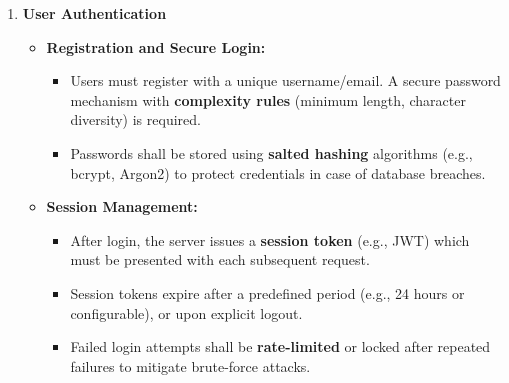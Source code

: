 \documentclass{article}
\begin{document}
\begin{enumerate}[label=\textbf{FR\arabic*.}]
\item \textbf{User Authentication}
\begin{itemize}
    \item \textbf{Registration and Secure Login:}
    \begin{itemize}
        \item Users must register with a unique username/email. A secure password mechanism with \textbf{complexity rules} (minimum length, character diversity) is required.
        \item Passwords shall be stored using \textbf{salted hashing} algorithms (e.g., bcrypt, Argon2) to protect credentials in case of database breaches.
    \end{itemize}
    \item \textbf{Session Management:}
    \begin{itemize}
        \item After login, the server issues a \textbf{session token} (e.g., JWT) which must be presented with each subsequent request.
        \item Session tokens expire after a predefined period (e.g., 24 hours or configurable), or upon explicit logout.
        \item Failed login attempts shall be \textbf{rate-limited} or locked after repeated failures to mitigate brute-force attacks.
    \end{itemize}
\end{itemize}


\end{enumerate}
\end{document}
